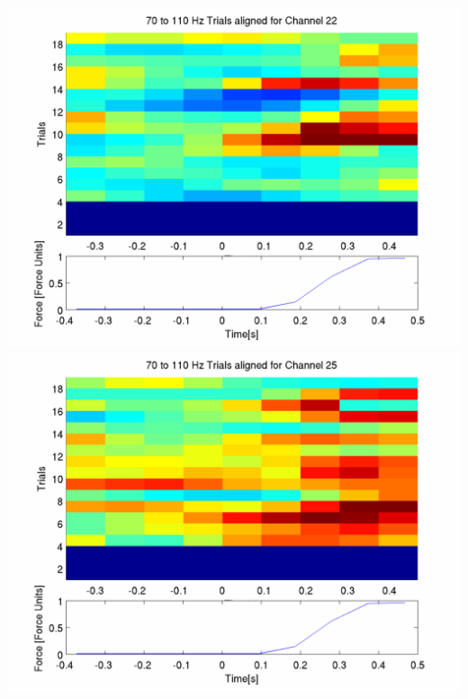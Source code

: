 \documentclass[12pt]{article}
\begin{document}
\includegraphics[scale=0.2]{plot_1_aligned_trials.png}
\includegraphics[scale=0.2]{plot_2_aligned_trials.png}
\end{document}
